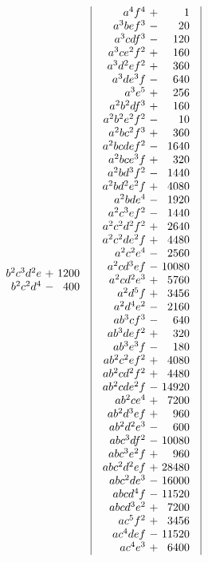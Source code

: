 \[\begin{array}{@{}c|c|c|c@{}}
\begin{array}{r@{\ }c@{\ }r}
b^2c^3d^2e&+&1200\\
b^2c^2d^4&-&400
\end{array}
&
\begin{array}{r@{\ }c@{\ }r}
a^4f^4&+&1\\
a^3bef^3&-&20\\
a^3cdf^3&-&120\\
a^3ce^2f^2&+&160\\
a^3d^2ef^2&+&360\\
a^3de^3f&-&640\\
a^3e^5&+&256\\
a^2b^2df^3&+&160\\
a^2b^2e^2f^2&-&10\\
a^2bc^2f^3&+&360\\
a^2bcdef^2&-&1640\\
a^2bce^3f&+&320\\
a^2bd^3f^2&-&1440\\
a^2bd^2e^2f&+&4080\\
a^2bde^4&-&1920\\
a^2c^3ef^2&-&1440\\
a^2c^2d^2f^2&+&2640\\
a^2c^2de^2f&+&4480\\
a^2c^2e^4&-&2560\\
a^2cd^3ef&-&10080\\
a^2cd^2e^3&+&5760\\
a^2d^5f&+&3456\\
a^2d^4e^2&-&2160\\
ab^3cf^3&-&640\\
ab^3def^2&+&320\\
ab^3e^3f&-&180\\
ab^2c^2ef^2&+&4080\\
ab^2cd^2f^2&+&4480\\
ab^2cde^2f&-&14920\\
ab^2ce^4&+&7200\\
ab^2d^3ef&+&960\\
ab^2d^2e^3&-&600\\
abc^3df^2&-&10080\\
abc^3e^2f&+&960\\
abc^2d^2ef&+&28480\\
abc^2de^3&-&16000\\
abcd^4f&-&11520\\
abcd^3e^2&+&7200\\
ac^5f^2&+&3456\\
ac^4def&-&11520\\
ac^4e^3&+&6400\\

\end{array}
\end{array}\]
